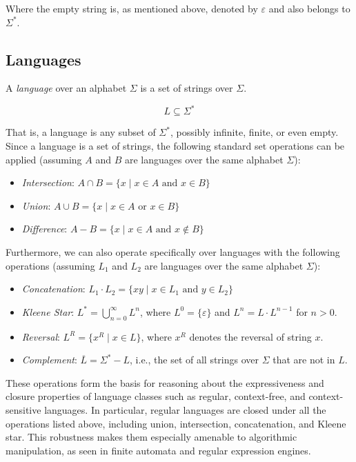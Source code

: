 Where the empty string is, as mentioned above, denoted by $\varepsilon$ and also belongs to $\Sigma^*$.

\subsection*{Languages}

A \emph{language} over an alphabet $\Sigma$ is a set of strings over $\Sigma$.

\[
L \subseteq \Sigma^*
\]

That is, a language is any subset of $\Sigma^*$, possibly infinite, finite, or even empty. \newline
Since a language is a set of strings, the following standard set operations can be applied (assuming $A$ and $B$ are languages over the same alphabet $\Sigma$):

\begin{itemize}
	\item \emph{Intersection}: $A \cap B = \{ x \mid x \in A \text{ and } x \in B \}$
	\item \emph{Union}: $A \cup B = \{ x \mid x \in A \text{ or } x \in B \}$
	\item \emph{Difference}: $A - B = \{ x \mid x \in A \text{ and } x \notin B \}$
\end{itemize}

Furthermore, we can also operate specifically over languages with the following operations (assuming $L_1$ and $L_2$ are languages over the same alphabet $\Sigma$):

\begin{itemize}
	\item \emph{Concatenation}: $L_1 \cdot L_2 = \{ xy \mid x \in L_1 \text{ and } y \in L_2 \}$
	\item \emph{Kleene Star}: $L^* = \bigcup_{n=0}^{\infty} L^n$, where $L^0 = \{\varepsilon\}$ and $L^n = L \cdot L^{n-1}$ for $n > 0$.
	\item \emph{Reversal}: $L^R = \{ x^R \mid x \in L \}$, where $x^R$ denotes the reversal of string $x$.
	\item \emph{Complement}: $\overline{L} = \Sigma^* - L$, i.e., the set of all strings over $\Sigma$ that are not in $L$.
\end{itemize}

These operations form the basis for reasoning about the expressiveness and closure properties of language classes such as regular, context-free, and context-sensitive languages. In particular, regular languages are closed under all the operations listed above, including union, intersection, concatenation, and Kleene star. This robustness makes them especially amenable to algorithmic manipulation, as seen in finite automata and regular expression engines.

